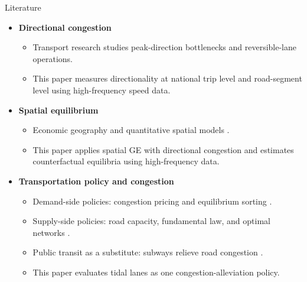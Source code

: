 \documentclass[11pt,aspectratio=169]{beamer}
\begin{document}
\begin{frame}{Literature}
\begin{itemize}\small
  \item \textbf{Directional congestion}
  \begin{itemize}\footnotesize
    \item Transport research studies peak-direction bottlenecks and reversible-lane operations.
    \item This paper measures directionality at national trip level and road-segment level using high-frequency speed data.
  \end{itemize}
  \item \textbf{Spatial equilibrium}
  \begin{itemize}\footnotesize
    \item Economic geography and quantitative spatial models \citep{krugman1991,eaton2002,allen2014,ahlfeldt2015}.
    \item This paper applies spatial GE with directional congestion and estimates counterfactual equilibria using high-frequency data.
  \end{itemize}
  \item \textbf{Transportation policy and congestion}
  \begin{itemize}\footnotesize
    \item Demand-side policies: congestion pricing and equilibrium sorting \citep{vickrey1969,barwick2024,yang2020}.
    \item Supply-side policies: road capacity, fundamental law, and optimal networks \citep{duranton2011,fajgelbaum2020}.
    \item Public transit as a substitute: subways relieve road congestion \citep{gu2021}.
    \item This paper evaluates tidal lanes as one congestion-alleviation policy.
  \end{itemize}
\end{itemize}
\end{frame}
\end{document}
